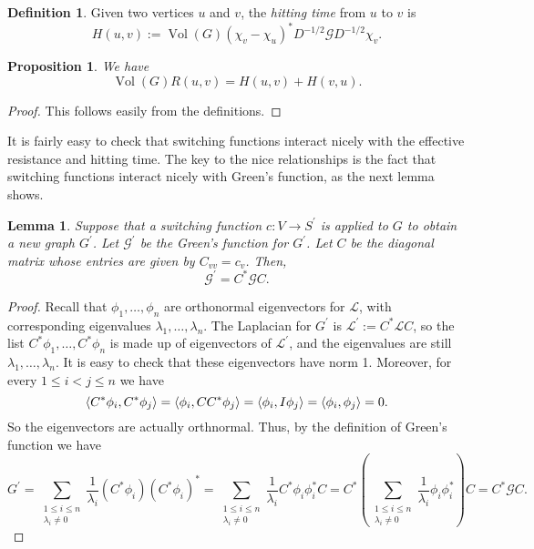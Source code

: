 \documentclass[12pt]{article}
\newtheorem{prop}[thm]{Proposition}
\newtheorem{lem}[thm]{Lemma}
\theoremstyle{definition}
\newtheorem{defn}[thm]{Definition}
\DeclareMathOperator{\vol}{Vol}
\newcommand{\lap}{\mathcal{L}}
\newcommand{\green}{\mathcal{G}}
\DeclarePairedDelimiter\inner{\langle}{\rangle}
\begin{document}
\begin{defn}
Given two vertices $u$ and $v$, the \textit{hitting time} from $u$ to $v$ is 
$$
H(u, v) := \vol(G) (\chi_v - \chi_u)^* D^{-1/2} \green D^{-1/2} \chi_v.
$$  
\end{defn}

\begin{prop}
We have $$\vol(G) R(u, v) = H(u, v) + H(v, u).$$
\end{prop}
\begin{proof}
This follows easily from the definitions.
\end{proof}

It is fairly easy to check that switching functions interact nicely with the effective resistance and hitting time. The key to the nice relationships is the fact that switching functions interact nicely with Green's function, as the next lemma shows.

\begin{lem}
Suppose that a switching function $c: V \rightarrow S^\prime$ is applied to $G$ to obtain a new graph $G^\prime$. Let $\green^\prime$ be the Green's function for $G^\prime$. Let $C$ be the diagonal matrix whose entries are given by $C_{vv} = c_v$. Then, $$\green^\prime = C^* \green C.$$
\end{lem}
\begin{proof}
Recall that $\phi_1, \dots, \phi_n$ are orthonormal eigenvectors for $\lap$, with corresponding eigenvalues $\lambda_1, \dots, \lambda_n$. The Laplacian for $G^\prime$ is $\lap^\prime := C^* \lap C$, so the list $C^* \phi_1, \dots, C^* \phi_n$ is made up of eigenvectors of $\lap^\prime$, and the eigenvalues are still $\lambda_1, \dots, \lambda_n$. It is easy to check that these eigenvectors have norm 1. Moreover, for every $1 \leq i < j \leq n$ we have
$$
\inner*{C^* \phi_i, C^* \phi_j} = \inner*{\phi_i, C C^* \phi_j} = \inner*{\phi_i, I \phi_j} = \inner*{\phi_i, \phi_j} = 0.
$$
So the eigenvectors are actually orthnormal. Thus, by the definition of Green's function we have
$$
G^\prime = \sum_{\substack{1 \leq i \leq n \\ \lambda_i \neq 0}} \frac{1}{\lambda_i} \left( C^* \phi_i \right) \left( C^* \phi_i \right)^*
= \sum_{\substack{1 \leq i \leq n \\ \lambda_i \neq 0}} \frac{1}{\lambda_i} C^* \phi_i \phi_i^* C
= C^* \left( \sum_{\substack{1 \leq i \leq n \\ \lambda_i \neq 0}} \frac{1}{\lambda_i} \phi_i \phi_i^* \right) C
= C^* \green C.
$$
\end{proof}
\end{document}

